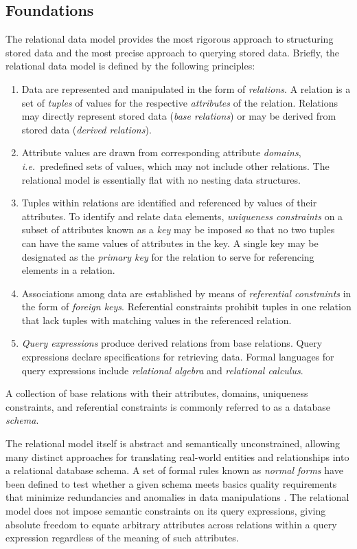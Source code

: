\documentclass[letter,twocolumn,11pt]{article}
\begin{document}
\subsection{Foundations}
The relational data model \citep{codd_relational_1970} provides the most rigorous approach to structuring stored data and the most precise approach to querying stored data.  
Briefly, the relational data model is defined by the following principles:
\begin{enumerate}
\item Data are represented and manipulated in the form of \emph{relations}. 
A relation is a set of \emph{tuples} of values for the respective \emph{attributes} of the relation.
Relations may directly represent stored data (\emph{base relations}) or may be derived from stored data (\emph{derived relations}).
\item Attribute values are drawn from corresponding attribute \emph{domains}, \emph{i.e.}\ predefined sets of values, which may not include other relations.
The relational model is essentially flat with no nesting data structures.
\item Tuples within relations are identified and referenced by values of their attributes.
To identify and relate data elements, \emph{uniqueness constraints} on a subset of attributes known as a \emph{key} may be imposed so that no two tuples can have the same values of attributes in the key. A single key may be designated as the \emph{primary key} for the relation to serve for referencing elements in a relation.
\item Associations among data are established by means of \emph{referential constraints} in the form of \emph{foreign keys}. 
Referential constraints prohibit tuples in one relation that lack tuples with matching values in the referenced relation. 
\item \emph{Query expressions} produce derived relations from base relations.  Query expressions declare specifications for retrieving data.
Formal languages for query expressions include \emph{relational algebra} and \emph{relational calculus}.  
\end{enumerate}

A collection of base relations with their attributes, domains, uniqueness constraints, and referential constraints is commonly referred to as a database \emph{schema}.

The relational model itself is abstract and semantically unconstrained, allowing many distinct approaches for translating real-world entities and relationships into a relational database schema. 
A set of formal rules known as \emph{normal forms} have been defined to test whether a given schema meets basics quality requirements that minimize redundancies and anomalies in data manipulations \citep{kent-1983-simple}.
The relational model does not impose semantic constraints on its query expressions, giving absolute freedom to equate arbitrary attributes across relations within a query expression regardless of the meaning of such attributes.
\end{document}
